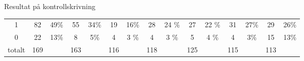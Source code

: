 \begin{Slide}{Resultat på kontrollskrivning}
{\begin{minipage}{\textwidth}
\begin{tabular}{c | c c | c c | c c | c c | c c | c  c | c  c}
    1 &     82 & 49\% &    55 & 34\% &    19 &  16\%& 28    & 24 \% & 27    & 22 \%& 31    & 27\% & 29    & 26\% \\
    0 &     22 & 13\% &    8  &  5\% &    4  &  3 \%&  4    & 3  \% & 5     & 4  \%&  4    & 3\%  & 15    & 13\% \\ \hline
totalt   & 169 &     &   163 &   &   116 &      &  118  &       & 125   &      & 115   &      & 113   &  \\  
\end{tabular}
\end{minipage}
}

\end{Slide}






